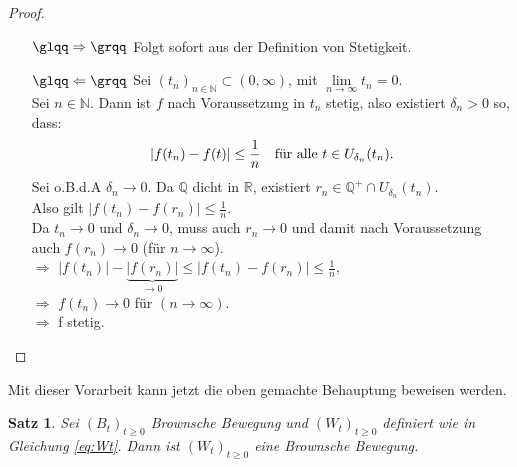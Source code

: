 \documentclass[12pt,a4paper]{scrartcl}
\numberwithin{equation}{section}
\newcommand{\R}{\mathbb{R}} %
\newcommand{\Q}{\mathbb{Q}} %
\newcommand{\N}{\mathbb{N}} %
\numberwithin{equation}{section}%
\newtheorem{satz}[thm]{Satz}%
\theoremstyle{definition}
\begin{document}
\begin{proof}\
\begin{itemize}
\item[$\glqq\Rightarrow\grqq$] Folgt sofort aus der Definition von Stetigkeit.
\item[$\glqq\Leftarrow\grqq$] Sei $(t_n)_{n\in \N} \subset (0,\infty)$, mit $\underset{n\to \infty}\lim t_n = 0$.\\
Sei $n\in \N$. Dann ist $f$ nach Voraussetzung in $t_n$ stetig, also existiert $\delta_n > 0$ so, dass:
\begin{align*}
\vert f(t_n)-f(t)\vert \leq \frac{1}{n} \text{\quad für alle } t \in U_{\delta_n}(t_n).
\end{align*}
Sei o.B.d.A $\delta_n \to 0$. Da $\Q$ dicht in $\R$, existiert $r_n \in \Q^+ \cap U_{\delta_n}(t_n)$.\\
Also gilt $\vert f(t_n)-f(r_n) \vert \leq \frac{1}{n}$.\\
Da $t_n \rightarrow 0$ und $\delta_n \rightarrow 0$, muss auch $r_n \rightarrow 0$ und damit nach Voraussetzung auch $f(r_n)  \rightarrow 0$ (für $n \to \infty$).\\
$\Rightarrow$ $\vert f(t_n)\vert -\underbrace{\vert f(r_n)\vert}_{\to 0}  \leq \vert f(t_n)-f(r_n)\vert \leq \frac{1}{n}$,\\
$\Rightarrow$ $f(t_n) \to 0$ für $(n \to \infty)$.\\
$\Rightarrow$ f stetig.
\end{itemize}
\end{proof}

\noindent Mit dieser Vorarbeit kann jetzt die oben gemachte Behauptung beweisen werden.
\begin{satz}
Sei $(B_t)_{t\geq 0}$ Brownsche Bewegung und $(W_t)_{t\geq 0}$ definiert wie in Gleichung \eqref{eq:Wt}. Dann ist $(W_t)_{t\geq 0}$ eine Brownsche Bewegung.
\end{satz}
\end{document}
